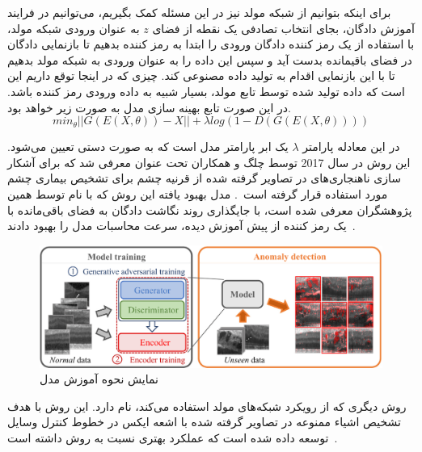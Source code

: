\documentclass[12pt,a4paper]{report}
\begin{document}
برای اینکه بتوانیم از شبکه مولد نیز در این مسئله کمک بگیریم، می‌توانیم در فرایند آموزش دادگان، بجای انتخاب تصادفی یک نقطه از فضای $z$ به عنوان ورودی شبکه مولد، با استفاده از یک رمز کننده دادگان ورودی را ابتدا به رمز کننده بدهیم تا بازنمایی دادگان در فضای باقیمانده بدست آید و سپس این داده را به عنوان ورودی به شبکه مولد بدهیم تا با این بازنمایی اقدام به تولید داده مصنوعی کند. چیزی که در اینجا توقع داریم این است که داده تولید شده توسط تابع مولد، بسیار شبیه به داده ورودی رمز کننده باشد. در این صورت تابع بهینه سازی مدل به صورت زیر خواهد بود.
\begin{equation}
	min_\theta ||G(E(X, \theta)) - X|| + \lambda log(1-D(G(E(X, \theta))))
\end{equation}

در این معادله پارامتر $\lambda$ یک ابر پارامتر مدل است که به صورت دستی تعیین می‌شود. این روش در سال 2017 توسط چلگ و همکاران تحت عنوان  معرفی شد که برای آشکار سازی ناهنجاری‌های در تصاویر  گرفته شده از قرنیه چشم برای تشخیص بیماری چشم مورد استفاده قرار گرفته است~\cite{10.1007/978-3-319-59050-9_12}. مدل بهبود یافته این روش که با نام  توسط همین پژوهشگران معرفی شده است، با جایگذاری روند نگاشت دادگان به فضای باقی‌مانده با یک رمز کننده از پیش آموزش دیده، سرعت محاسبات مدل را بهبود دادند~\cite{SCHLEGL201930}.
\begin{figure}[!h]
	\begin{center}
		\includegraphics[width=0.7\linewidth]{./images/figures/anogan.png}
	\end{center}
	\caption{نمایش نحوه آموزش مدل ~\cite{SCHLEGL201930}}
	\label{fig:vae}
	\centering
\end{figure}

روش دیگری که از رویکرد شبکه‌های مولد استفاده می‌کند،  نام دارد. این روش با هدف تشخیص اشیاء ممنوعه در تصاویر گرفته شده با اشعه ایکس در خطوط کنترل وسایل توسعه داده شده است که عملکرد بهتری نسبت به روش داشته است~\cite{akcay2018ganomaly}.
\end{document}
